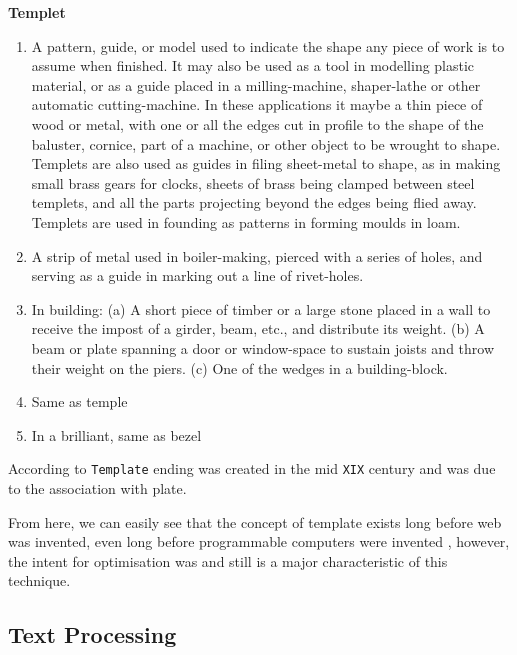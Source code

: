 \begin{bookQuote}
     \textbf{Templet} 
     
     \begin{enumerate}
         \item A pattern, guide, or model used to indicate the shape any piece of work is to assume when finished. It may also be used as a tool in modelling plastic material, or as a guide placed in a milling-machine, shaper-lathe or other automatic cutting-machine. In these applications it maybe a thin piece of wood or metal, with one or all the edges cut in profile to the shape of the baluster, cornice, part of a machine, or other object to be wrought to shape. Templets are also used as guides in filing sheet-metal to shape, as in making small brass gears for clocks, sheets of brass being clamped between steel templets, and all the parts projecting beyond the edges being flied away. Templets are used in founding as patterns in forming moulds in loam.
         
         \item A strip of metal used in boiler-making, pierced with a series of holes, and serving as a guide in marking out a line of rivet-holes.
         \item In building: (a) A short piece of timber or a large stone placed in a wall to receive the impost of a girder, beam, etc., and distribute its weight. (b) A beam or plate spanning a door or window-space to sustain joists and throw their weight on the piers. (c) One of the wedges in a building-block.
         \item Same as temple
         \item In a brilliant, same as bezel
     \end{enumerate}
\end{bookQuote}

According to \cite{Barnhart1988TheEtymology} \texttt{Template} ending was created in the mid \texttt{XIX} century and was due to the association with plate. 

From here, we can easily see that the concept of template exists long before web was invented, even long before programmable computers were invented \cite{Clements2014ComputerVariations}, however, the intent for optimisation was and still is a major characteristic of this technique.

\subsection{Text Processing}

